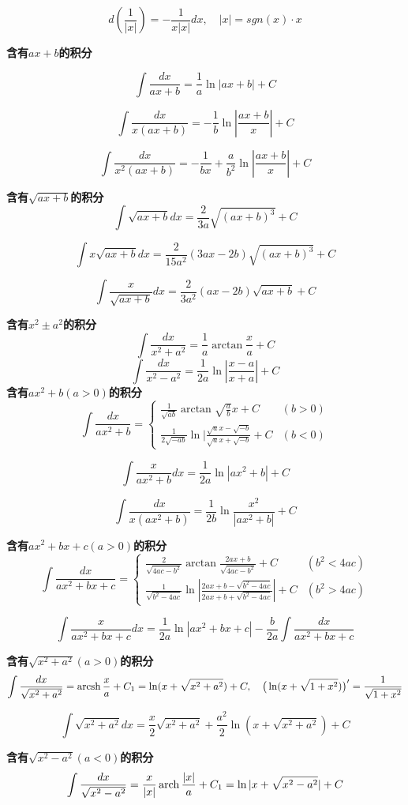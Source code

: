 \documentclass{book}
\begin{document}
$$ d(\frac{1}{|x|})=-\frac{1}{x|x|}dx, \quad |x|=sgn(x)\cdot x $$

\textbf{含有$ax+b$的积分}

$$ \int \frac{dx}{ax+b}=\frac{1}{a}\ln|ax+b|+C $$

$$ \int \frac{dx}{x(ax+b)}=-\frac{1}{b}\ln|\frac{ax+b}{x}|+C $$

$$ \int \frac{dx}{x^2(ax+b)}=-\frac{ 1}{bx}+\frac{ a}{b^2}\ln |\frac{ax+b}{x}|+C $$

\textbf{含有$\sqrt{ax+b}$的积分}
$$ \int \sqrt{ax+b}dx=\frac{2}{3a}\sqrt{(ax+b)^3}+C $$

$$ \int x\sqrt{ax+b}dx=\frac{2}{15a^2}(3ax-2b)\sqrt{(ax+b)^3}+C $$

$$ \int \frac{x}{\sqrt{ax+b}}dx=\frac{2}{3a^2}(ax-2b)\sqrt{ax+b}+C $$

\textbf{含有$x^2 \pm a^2$的积分}
$$ \int \frac{dx}{x^2+a^2}=\frac{1}{a}\arctan \frac{x}{a}+C $$
$$ \int \frac{dx}{x^2-a^2}=\frac{1}{2a}\ln |\frac{x-a}{x+a}|+C $$
\textbf{含有$ax^2+b(a>0)$的积分}
$$
\int \frac{dx}{ax^2+b}=
\left\{
		\begin{array}{ll}
			\frac{1}{\sqrt{ab}}\arctan \sqrt{\frac{a}{b}}x+C & (b>0) \\
			\frac{1}{2\sqrt{-ab}}\ln|\frac{\sqrt{a}x-\sqrt{-b}}{\sqrt{a}x+\sqrt{-b}}+C & (b<0)
		\end{array}
		\right.
$$

$$ \int \frac{x}{ax^2+b}dx=\frac{1}{2a}\ln |ax^2+b|+C $$

$$ \int \frac{dx}{x(ax^2+b)}=\frac{1}{2b}\ln \frac{x^2}{|ax^2+b|}+C $$

\textbf{含有$ax^2+bx+c(a>0)$的积分}
$$
\int \frac{ dx}{ax^2+bx+c}=
\left\{
		\begin{array}{ll}
		 \frac{2}{\sqrt{4ac-b^2}}\arctan \frac{2ax+b}{\sqrt{4ac-b^2}}+C & (b^2<4ac) \\
		 \frac{1}{\sqrt{b^2-4ac}}\ln|\frac{2ax+b-\sqrt{b^2-4ac}}{2ax+b+\sqrt{b^2-4ac}}|+C & (b^2>4ac)
		\end{array}
		\right.
$$

$$ \int \frac{x}{ax^2+bx+c}dx=\frac{1}{2a}\ln|ax^2+bx+c|-\frac{b}{2a}\int \frac{dx}{ax^2+bx+c} $$

\textbf{含有$\sqrt{x^2+a^2}(a>0)$的积分}
$$ \int \frac{dx}{\sqrt{x^2+a^2}}=\operatorname{arcsh} \frac{x}{a}+C_1=\ln(x+\sqrt{x^2+a^2})+C,\quad \big( \ln(x+\sqrt{1+x^2})\big)'=\frac{1}{\sqrt{1+x^2}} $$

$$ \int \sqrt{x^2+a^2}dx=\frac{x}{2}\sqrt{x^2+a^2}+\frac{a^2}{2}\ln(x+\sqrt{x^2+a^2})+C $$

\textbf{含有$\sqrt{x^2-a^2}(a<0)$的积分}
$$ \int \frac{dx}{\sqrt{x^2-a^2}}=\frac{x}{|x|}\operatorname{arch} \frac{|x|}{a}+C_1= \ln|x+\sqrt{x^2-a^2}|+C $$
\end{document}
